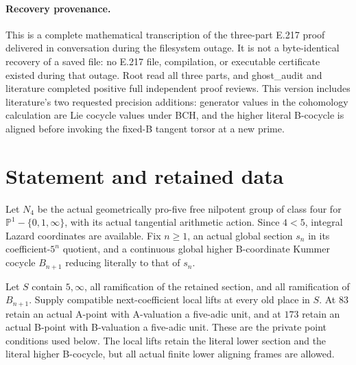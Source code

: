 \paragraph{Recovery provenance.}
This is a complete mathematical transcription of the three-part E.217 proof delivered in conversation during the filesystem outage. It is not a byte-identical recovery of a saved file: no E.217 file, compilation, or executable certificate existed during that outage. Root read all three parts, and ghost\_audit and literature completed positive full independent proof reviews. This version includes literature's two requested precision additions: generator values in the cohomology calculation are Lie cocycle values under BCH, and the higher literal B-cocycle is aligned before invoking the fixed-B tangent torsor at a new prime.

\section*{Statement and retained data}
Let $N_4$ be the actual geometrically pro-five free nilpotent group of class four for $\mathbb P^1-\{0,1,\infty\}$, with its actual tangential arithmetic action. Since $4<5$, integral Lazard coordinates are available. Fix $n\ge1$, an actual global section $s_n$ in its coefficient-$5^n$ quotient, and a continuous global higher B-coordinate Kummer cocycle $B_{n+1}$ reducing literally to that of $s_n$.

Let $S$ contain $5,\infty$, all ramification of the retained section, and all ramification of $B_{n+1}$. Supply compatible next-coefficient local lifts at every old place in $S$. At $83$ retain an actual A-point with A-valuation a five-adic unit, and at $173$ retain an actual B-point with B-valuation a five-adic unit. These are the private point conditions used below. The local lifts retain the literal lower section and the literal higher B-cocycle, but all actual finite lower aligning frames are allowed.

